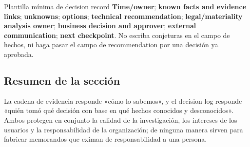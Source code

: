 \begin{importantbox}{Plantilla mínima de decision record}
\textbf{Time/owner}; \textbf{known facts and evidence links}; \textbf{unknowns}; \textbf{options}; \textbf{technical recommendation}; \textbf{legal/materiality analysis owner}; \textbf{business decision and approver}; \textbf{external communication}; \textbf{next checkpoint}. No escriba conjeturas en el campo de hechos, ni haga pasar el campo de recommendation por una decisión ya aprobada.
\end{importantbox}

\subsection{Resumen de la sección}

La cadena de evidencia responde «cómo lo sabemos», y el decision log responde «quién tomó qué decisión con base en qué hechos conocidos y desconocidos». Ambos protegen en conjunto la calidad de la investigación, los intereses de los usuarios y la responsabilidad de la organización; de ninguna manera sirven para fabricar memorandos que eximan de responsabilidad a una persona.

